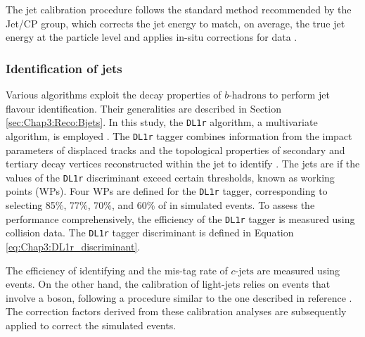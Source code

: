 The jet calibration procedure follows the standard method recommended by the Jet/\met CP group, 
which corrects the jet energy to match, on average, the true jet energy at the particle level and applies 
in-situ corrections for data \cite{JETM-2018-05}. 



\subsubsection{Identification of \btagged jets}
\label{sec:ChaptH:ObjectDefReco:bjets}
Various algorithms exploit the decay properties of \ensuremath{b\text{-hadrons}} to perform 
jet flavour identification. Their generalities are described in Section \ref{sec:Chap3:Reco:Bjets}.
In this study, the \texttt{DL1r} algorithm, a multivariate \btag algorithm, 
is employed \cite{ATL-PHYS-PUB-2015-039,ATL-PHYS-PUB-2017-013,ATL-PHYS-PUB-2017-003}. 
The \texttt{DL1r} tagger combines information from the impact parameters of displaced tracks 
and the topological properties of secondary and tertiary decay vertices reconstructed within the 
jet to identify \bjets. The jets are \btagged if the values of the \texttt{DL1r} discriminant exceed certain 
thresholds, known as working points (WPs). Four WPs are defined for the \texttt{DL1r} tagger, 
corresponding to selecting 85\%, 77\%, 70\%, and 60\% of \bjets in \ttbar simulated events. 
To assess the \btag performance comprehensively, the efficiency of the \texttt{DL1r} tagger is 
measured using collision data. The \texttt{DL1r} tagger discriminant is
defined in Equation \ref{eq:Chap3:DL1r_discriminant}.

The efficiency of identifying \bjets \cite{FTAG-2018-01} and the mis-tag rate of 
\ensuremath{c\text{-jets}} \cite{ATLAS-CONF-2018-001} are measured using \ttbar events. 
On the other hand, the calibration of light-jets relies on events that involve a \PZ boson, 
following a procedure similar to the one described in reference \cite{ATLAS-CONF-2018-006}. 
The correction factors derived from these calibration analyses are subsequently applied to correct 
the simulated events.

